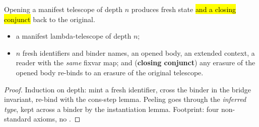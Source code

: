 \begin{lemma}
\label{lem:bridge_alt_telescope}
\leanok
{}
 Opening a manifest telescope of depth $n$ produces fresh state \hl{and a closing
conjunct} back to the original.
\begin{itemize}
\item {} a manifest lambda-telescope of depth $n$;
\item {} $n$ fresh identifiers and binder names, an opened body, an extended context, a reader
with the \emph{same} fixvar map; and (\textbf{closing conjunct}) any erasure of the opened body re-binds
to an erasure of the original telescope.
\end{itemize}
\end{lemma}
\begin{proof}
\leanok
{}
 Induction on depth: mint a fresh identifier, cross the binder in the bridge invariant,
re-bind with the cons-step lemma. Peeling goes through the \emph{inferred type}, kept across a binder by
the instantiation lemma. Footprint: four non-standard axioms, no .
\end{proof}

